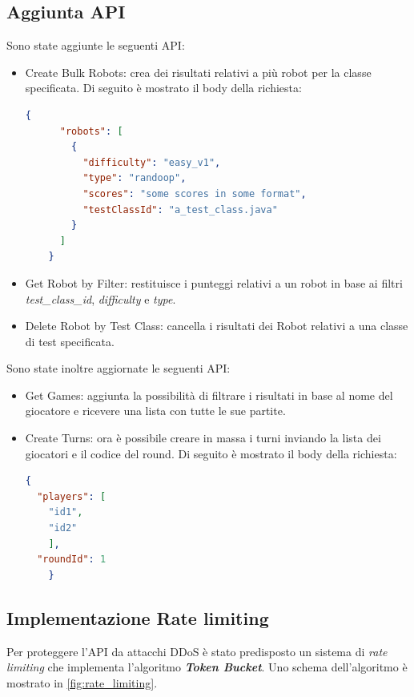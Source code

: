 \documentclass{article}
\begin{document}
\subsection{Aggiunta API}
Sono state aggiunte le seguenti API:
\begin{itemize}
    \item Create Bulk Robots: crea dei risultati relativi a più robot per la classe specificata. Di seguito è mostrato il body della richiesta:
    \begin{lstlisting}[language=json,firstnumber=1]
    {
      "robots": [
        {
          "difficulty": "easy_v1",
          "type": "randoop",
          "scores": "some scores in some format",
          "testClassId": "a_test_class.java"
        }
      ]
    }
    \end{lstlisting}
    \item Get Robot by Filter: restituisce i punteggi relativi a un robot in base ai filtri \textit{test\_class\_id}, \textit{difficulty} e \textit{type}. 
    \item Delete Robot by Test Class: cancella i risultati dei Robot relativi a una classe di test specificata. 
\end{itemize}

Sono state inoltre aggiornate le seguenti API:
\begin{itemize}
    \item Get Games: aggiunta la possibilità di filtrare i risultati in base al nome del giocatore e ricevere una lista con tutte le sue partite.
    \item Create Turns: ora è possibile creare in massa i turni inviando la lista dei giocatori e il codice del round.
    Di seguito è mostrato il body della richiesta:
    \begin{lstlisting}[language=json,firstnumber=1]
    {
  "players": [
    "id1",
    "id2"
    ],
  "roundId": 1
    }
    \end{lstlisting}


\end{itemize}


\clearpage

\subsection{Implementazione Rate limiting}
Per proteggere l'API da attacchi DDoS è stato predisposto un sistema di \textit{rate limiting} che implementa l'algoritmo \textit{\textbf{Token Bucket}}. Uno schema dell'algoritmo è mostrato in \cref{fig:rate_limiting}.
\end{document}
